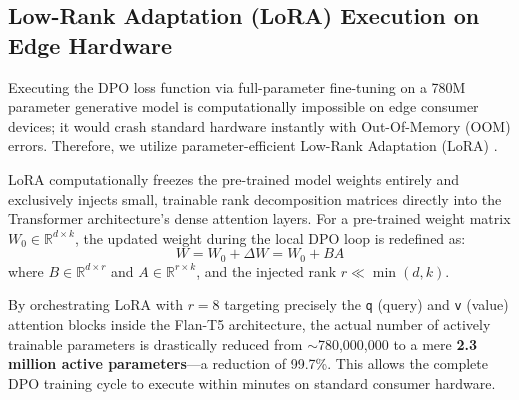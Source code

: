\documentclass[12pt,twoside]{article}
\begin{document}
\subsection{Low-Rank Adaptation (LoRA) Execution on Edge Hardware}

Executing the DPO loss function via full-parameter fine-tuning on a 780M parameter generative model is computationally impossible on edge consumer devices; it would crash standard hardware instantly with Out-Of-Memory (OOM) errors. Therefore, we utilize parameter-efficient Low-Rank Adaptation (LoRA) \citep{hu2021lora}.

LoRA computationally freezes the pre-trained model weights entirely and exclusively injects small, trainable rank decomposition matrices directly into the Transformer architecture's dense attention layers. For a pre-trained weight matrix $W_0 \in \mathbb{R}^{d \times k}$, the updated weight during the local DPO loop is redefined as:
\begin{equation}
  W = W_0 + \Delta W = W_0 + BA
\end{equation}
where $B \in \mathbb{R}^{d \times r}$ and $A \in \mathbb{R}^{r \times k}$, and the injected rank $r \ll \min(d, k)$.

By orchestrating LoRA with $r = 8$ targeting precisely the \texttt{q} (query) and \texttt{v} (value) attention blocks inside the Flan-T5 architecture, the actual number of actively trainable parameters is drastically reduced from $\sim$780,000,000 to a mere \textbf{2.3 million active parameters}---a reduction of 99.7\%. This allows the complete DPO training cycle to execute within minutes on standard consumer hardware.
\end{document}
